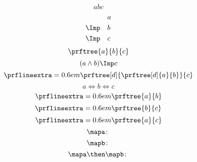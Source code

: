 {\begin{forslides}
\begin{equation*}
{                {a}
                {b}}
            {c}
        \end{equation*}
        \begin{equation*}
            \label{eq:abc_2}
            \begin{aligned}
                           & a \\
                \Imp \quad & b \\
                \Imp \quad & c
            \end{aligned}
        \end{equation*}
        \begin{equation*}
            \label{eq:abc_3}
            \prftree{a}{b}{c}
        \end{equation*}
        \begin{equation*}
            \label{eq:abc_4}
            (a\wedge b)\Imp c
        \end{equation*}
        \begin{equation*}
            \label{eq:abc_5}
            \prflineextra=0.6em
            \prftree[d]
            {\prftree[d]
                {a}
                {b}}
            {c}
        \end{equation*}
        \begin{equation*}
            \label{eq:abc_6}
            a\Leftrightarrow b \Leftrightarrow c
        \end{equation*}
        \begin{equation*}
            \label{eq:abc_7}
            \prflineextra=0.6em
            \prftree{a}{b}
        \end{equation*}
        \begin{equation*}
            \label{eq:abc_8}
            \prflineextra=0.6em
            \prftree{b}{c}
        \end{equation*}
        \begin{equation*}
            \label{eq:abc_9}
            \prflineextra=0.6em
            \prftree{a}{c}
        \end{equation*}
        \begin{equation*}
            \label{eq:mapf}
            \mapa \colon
        \end{equation*}
        \begin{equation*}
            \label{eq:mapg}
            \mapb \colon
        \end{equation*}
        \begin{equation*}
            \label{eq:mapcomp}
            \mapa \then \mapb \colon

\end{equation*}
\end{forslides}}
